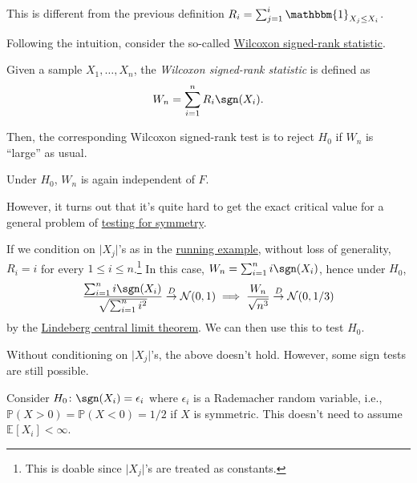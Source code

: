 \begin{prev}
	This is different from the previous definition \(R_i = \sum_{j=1}^{i} \mathbbm{1}_{X_j \leq X_i} \).
\end{prev}

Following the intuition, consider the so-called \hyperref[def:Wilcoxon-signed-rank-statistic]{Wilcoxon signed-rank statistic}.

\begin{definition}\label{def:Wilcoxon-signed-rank-statistic}
	Given a sample \(X_1, \dots , X_n\), the \emph{Wilcoxon signed-rank statistic} is defined as
	\[
		W_n = \sum_{i=1}^{n} R_i \sgn (X_i).
	\]
\end{definition}

Then, the corresponding Wilcoxon signed-rank test is to reject \(H_0\) if \(W_n\) is ``large'' as usual.

\begin{note}
	Under \(H_0\), \(W_n\) is again independent of \(F\).
\end{note}

However, it turns out that it's quite hard to get the exact critical value for a general problem of \hyperref[prb:testing-symmetry]{testing for symmetry}.

\begin{eg}\label{eg:Wilcoxon-signed-rank-statistic-two-sample-probelm}
	If we condition on \(\vert X_j \vert \)'s as in the \hyperref[eg:two-sample-t-statistic]{running example}, without loss of generality, \(R_i = i\) for every \(1 \leq i \leq n\).\footnote{This is doable since \(\vert X_j \vert \)'s are treated as constants.} In this case, \(W_n = \sum_{i=1}^{n} i \sgn (X_i)\), hence under \(H_0\),
	\[
		\frac{\sum_{i=1}^{n} i \sgn (X_i)}{\sqrt{\sum_{i=1}^{n} i^2} }
		\overset{D}{\to} \mathcal{N} (0, 1)
		\implies \frac{W_n}{\sqrt{n^3} }
		\overset{D}{\to} \mathcal{N} (0, 1 / 3)
	\]
	by the \hyperref[thm:Lindeberg-CLT]{Lindeberg central limit theorem}. We can then use this to test \(H_0\).
\end{eg}

Without conditioning on \(\vert X_j \vert \)'s, the above doesn't hold. However, some sign tests are still possible.

\begin{intuition}
	Consider \(H_0 \colon \sgn (X_i) = \epsilon _i\) where \(\epsilon _i\) is a Rademacher random variable, i.e., \(\mathbb{P} (X > 0) = \mathbb{P} (X < 0) = 1 / 2\) if \(X\) is symmetric. This doesn't need to assume \(\mathbb{E}_{}[X_i] < \infty \).
\end{intuition}

